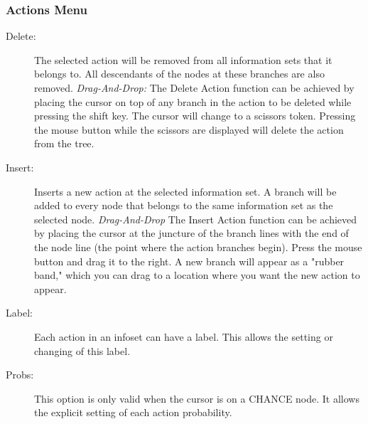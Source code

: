 \subsubsection{Actions Menu}
\begin{description}
\item[Delete:]  The selected action will be removed from all information sets 
that it belongs to.  All descendants of the nodes at these branches are also removed. 
{\em Drag-And-Drop:}  The Delete Action function can be achieved by placing the cursor 
on top of any branch in the action to be deleted while pressing the shift key.  
The cursor will change 
to a scissors token.  Pressing the mouse button while the scissors are displayed 
will delete the action from the tree. 
\item[Insert:]  Inserts a new action at the selected information set.  A branch 
will be added to every node that belongs to the same information set as the 
selected node. 
{\em Drag-And-Drop}  The Insert Action function can be achieved by 
placing the cursor at the juncture of the branch lines with the end of the node 
line (the point where the action branches begin).  Press the mouse button and drag 
it to the right.  A new branch will appear as a "rubber band,"  which you can drag 
to a location where you want the new action to appear.   
\item[Label:]  Each action in an infoset can have a label. 
This allows the setting or changing of this label. 
\item[Probs:]  This option is only valid when the cursor is on a
CHANCE node.  It allows the explicit setting of each action probability.
\end{description}

